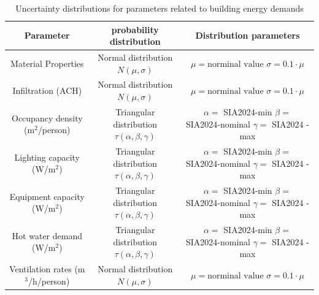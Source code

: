 \documentclass[a4paper, oneside]{discothesis}
\begin{document}
	\begin{table}[htbp]
    	\centering
    	\small
    	\caption{Uncertainty distributions for parameters related to building energy demands \cite{GeorgeThesis}}
    	    \begin{tabular}{|c|c|c|}

			\toprule
			Parameter           & probability distribution & Distribution parameters \\
			\hline
			Material Properties & \makecell{Normal distribution \\ $N(\mu,\sigma)$} & \makecell{$\mu = \text{norminal value}$\\$\sigma=0.1 \cdot \mu$}\\
			\hline
			Infiltration (ACH)  &\makecell{Normal distribution \\ $N(\mu,\sigma)$} & \makecell{$\mu = \text{norminal value}$\\$\sigma=0.1 \cdot \mu$}\\
			\hline
			\makecell{Occupancy density\\(m$^2$/person)} & \makecell{Triangular distribution \\ $\tau(\alpha,\beta,\gamma)$}  & \makecell{$\alpha = $ SIA2024-min \\ $\beta = $ SIA2024-nominal \\ $\gamma = $ SIA2024 -max} \\
			
			\hline
			
			\makecell{Lighting capacity\\(W/m$^2$)} & \makecell{Triangular distribution \\ $\tau(\alpha,\beta,\gamma)$}  & \makecell{$\alpha = $ SIA2024-min \\ $\beta = $ SIA2024-nominal \\ $\gamma = $ SIA2024 -max} \\
			\hline
			\makecell{Equipment capacity\\ (W/m$^2$)}& \makecell{Triangular distribution \\ $\tau(\alpha,\beta,\gamma)$}  & \makecell{$\alpha = $ SIA2024-min \\ $\beta = $ SIA2024-nominal \\ $\gamma = $ SIA2024 -max} \\
			\hline
			
			\makecell{Hot water demand\\(W/m$^2$)} & \makecell{Triangular distribution \\ $\tau(\alpha,\beta,\gamma)$}  & \makecell{$\alpha = $ SIA2024-min \\ $\beta = $ SIA2024-nominal \\ $\gamma = $ SIA2024 -max} \\
			\hline
			\makecell{Ventilation rates\\(m$^3$/h/person)} & \makecell{Normal distribution \\ $N(\mu,\sigma)$}      & \makecell{$\mu = \text{norminal value}$\\$\sigma=0.1 \cdot \mu$}                       \\
			\hline
			

\end{tabular}
\end{table}
\end{document}
